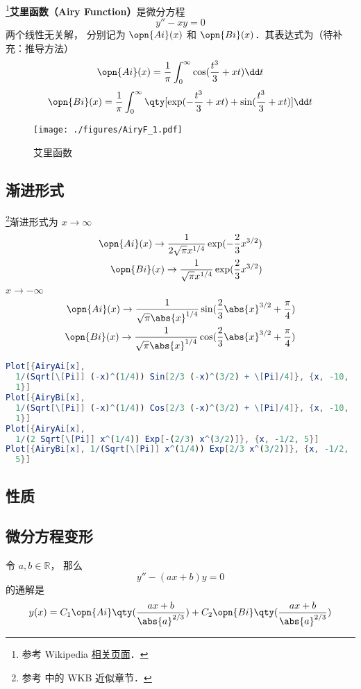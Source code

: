 
\begin{issues}
\issueDraft
\end{issues}

\footnote{参考 Wikipedia \href{https://en.wikipedia.org/wiki/Airy_function}{相关页面}．}\textbf{艾里函数（Airy Function）}是微分方程
\begin{equation}
y'' - xy = 0
\end{equation}
两个线性无关解， 分别记为 $\opn{Ai}(x)$ 和 $\opn{Bi}(x)$．其表达式为（待补充：推导方法）
\begin{equation}
\opn{Ai}(x)=\frac 1\pi \int_0^\infty \cos(\frac{t^3}{3}+xt)\dd t
\end{equation}
\begin{equation}
\opn{Bi}(x)=\frac 1\pi \int_0^\infty \qty[\exp(-\frac{t^3}{3}+xt)+\sin(\frac{t^3}{3}+xt)]\dd t
\end{equation}

\begin{figure}[ht]
\centering
\texttt{[image: ./figures/AiryF\_1.pdf]}
\caption{艾里函数} \label{AiryF_fig1}
\end{figure}

\subsection{渐进形式}
\footnote{参考 \cite{GriffQ} 中的 WKB 近似章节．}渐进形式为 $x \to \infty$
\begin{align}
\opn{Ai}(x) \to \frac{1}{2\sqrt{\pi} x^{1/4}} \exp(-\frac{2}{3}x^{3/2})\\
\opn{Bi}(x) \to \frac{1}{\sqrt{\pi} x^{1/4}} \exp(\frac{2}{3}x^{3/2})
\end{align}
$x \to -\infty$
\begin{align}
\opn{Ai}(x) \to \frac{1}{\sqrt{\pi} \abs{x}^{1/4}} \sin(\frac{2}{3}\abs{x}^{3/2}+\frac{\pi}{4})\\
\opn{Bi}(x) \to \frac{1}{\sqrt{\pi} \abs{x}^{1/4}} \cos(\frac{2}{3}\abs{x}^{3/2}+\frac{\pi}{4})
\end{align}

\begin{lstlisting}[language=Mathematica]
Plot[{AiryAi[x], 
  1/(Sqrt[\[Pi]] (-x)^(1/4)) Sin[2/3 (-x)^(3/2) + \[Pi]/4]}, {x, -10, 
  1}]
Plot[{AiryBi[x], 
  1/(Sqrt[\[Pi]] (-x)^(1/4)) Cos[2/3 (-x)^(3/2) + \[Pi]/4]}, {x, -10, 
  1}]
Plot[{AiryAi[x], 
  1/(2 Sqrt[\[Pi]] x^(1/4)) Exp[-(2/3) x^(3/2)]}, {x, -1/2, 5}]
Plot[{AiryBi[x], 1/(Sqrt[\[Pi]] x^(1/4)) Exp[2/3 x^(3/2)]}, {x, -1/2, 
  5}]
\end{lstlisting}
\subsection{性质}
\subsection{微分方程变形}
令 $a, b\in \mathbb R$， 那么
\begin{equation}
y'' - (ax + b) y = 0
\end{equation}
的通解是
\begin{equation}\label{AiryF_eq1}
y(x) = C_1\opn{Ai}\qty(\frac{ax+b}{\abs{a}^{2/3}}) + C_2 \opn{Bi}\qty(\frac{ax+b}{\abs{a}^{2/3}})
\end{equation}
